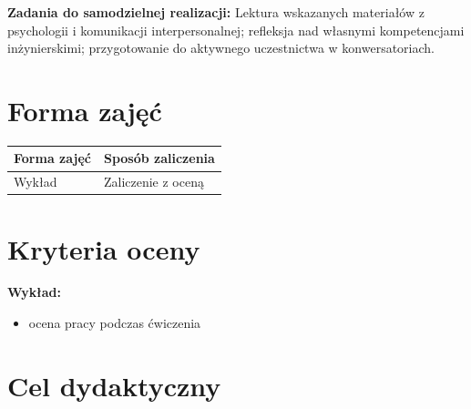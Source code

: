 \documentclass[12pt, a4paper]{article}
\newcommand{\thdrule}{\noalign{\global\setlength{\extrarowheight}{0pt}}}
\newcommand{\thdend}{\noalign{\global\setlength{\extrarowheight}{3pt}}}
\begin{document}
\vspace{4pt}
\noindent\textbf{Zadania do samodzielnej realizacji:} Lektura wskazanych materiałów z psychologii i komunikacji interpersonalnej; refleksja nad własnymi kompetencjami inżynierskimi; przygotowanie do aktywnego uczestnictwa w konwersatoriach.

\section{Forma zajęć}

\begin{center}
{\scriptsize
\begin{tabular}{m{5cm}m{8cm}}
\thdrule\toprule
\rowcolor{pjatkRed} {\color{white}\textbf{Forma zajęć}} & {\color{white}\textbf{Sposób zaliczenia}} \\
\midrule\thdend
  \rowcolor{tableRowLight} Wykład & Zaliczenie z oceną \\
\bottomrule
\end{tabular}}
\end{center}

\section{Kryteria oceny}

\textbf{Wykład:}
\begin{itemize}
  \item ocena pracy podczas ćwiczenia
\end{itemize}
\vspace{4pt}


\section{Cel dydaktyczny}
\end{document}
